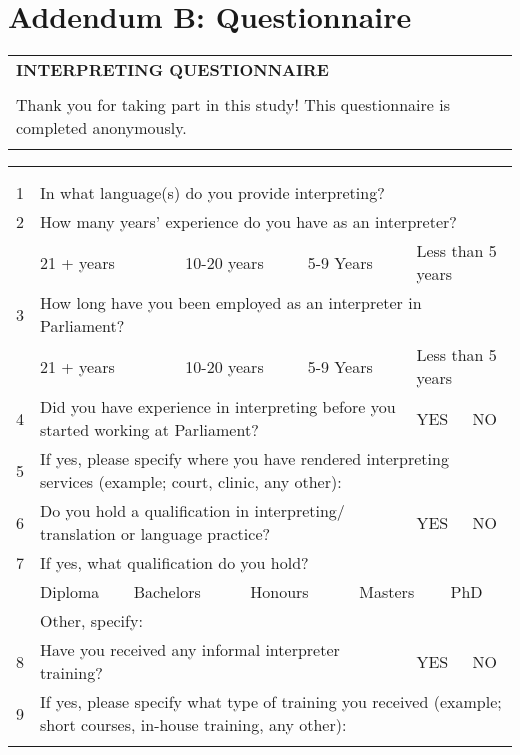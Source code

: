 \documentclass[output=paper]{langsci/langscibook}
\begin{document}
\section*{Addendum B: Questionnaire}
\label{03:addendum:B}
\begin{tabularx}{\textwidth}{X}
\lsptoprule

\textbf{INTERPRETING QUESTIONNAIRE}\\
\\
Thank you for taking part in this study! This questionnaire is completed anonymously. \\
\lspbottomrule
\end{tabularx}
\begin{tabularx}{\textwidth}{XXXXXXXXXX}
\lsptoprule

\multicolumn{10}{X}{\textbf{Section A: Interpreting Experience}

}\\
&  &  &  &  &  &  &  &  & \\
1 & \multicolumn{9}{X}{In what language(s) do you provide interpreting?

}\\
2 & \multicolumn{9}{X}{How many years’ experience do you have as an interpreter?}\\
& \multicolumn{2}{X}{21 + years

} & \multicolumn{2}{X}{10-20 years} & \multicolumn{2}{X}{5-9 Years} & \multicolumn{3}{X}{Less than 5 years}\\
3 & \multicolumn{9}{X}{How long have you been employed as an interpreter in Parliament?}\\
& \multicolumn{2}{X}{21 + years

} & \multicolumn{2}{X}{10-20 years} & \multicolumn{2}{X}{5-9 Years} & \multicolumn{3}{X}{Less than 5 years}\\
\hhline{~---------}
4 & \multicolumn{6}{X}{Did you have experience in interpreting before you started working at Parliament?} & \multicolumn{2}{X}{YES} & NO\\
5 & \multicolumn{9}{X}{If yes, please specify where you have rendered interpreting services (example; court, clinic, any other):

}\\
6 & \multicolumn{6}{X}{Do you hold a qualification in interpreting/ translation or language practice?} & \multicolumn{2}{X}{YES} & NO\\
7 & \multicolumn{9}{X}{If yes, what qualification do you hold?}\\
& \multicolumn{1}{X}{Diploma

} & \multicolumn{2}{X}{Bachelors} & \multicolumn{2}{X}{Honours} & \multicolumn{2}{X}{Masters} & \multicolumn{2}{X}{PhD}\\
\hhline{~---------} & \multicolumn{9}{X}{Other, specify:}\\
8 & \multicolumn{6}{X}{Have you received any informal interpreter training?} & \multicolumn{2}{X}{YES} & NO\\
9 & \multicolumn{9}{X}{If yes, please specify what type of training you received (example; short courses, in-house training, any other):}\\
\lspbottomrule
\end{tabularx}
\end{document}
